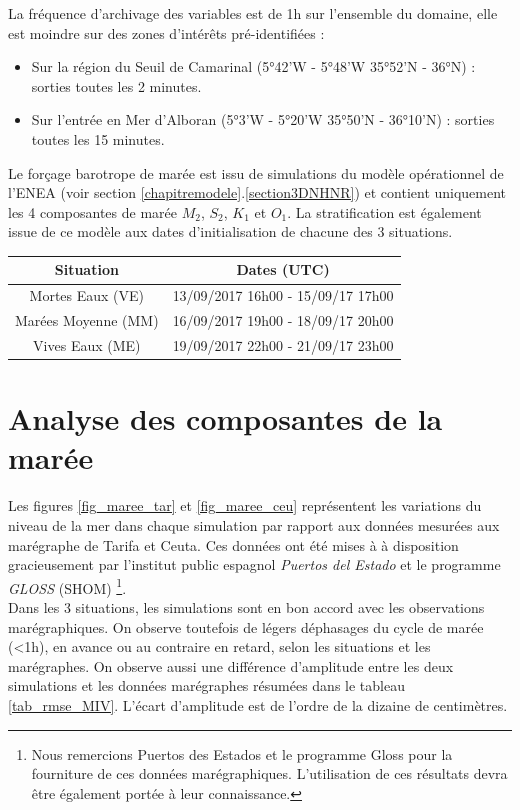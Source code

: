 \documentclass[a4paper,11pt]{report}
\begin{document}
\noindent La fréquence d'archivage des variables est de 1h sur l'ensemble du domaine, elle est moindre sur des zones d'intérêts pré-identifiées :
\begin{itemize}
\item Sur la région du Seuil de Camarinal (5°42'W - 5°48'W 35°52'N - 36°N) : sorties toutes les 2 minutes.
\item Sur l'entrée en Mer d'Alboran (5°3'W - 5°20'W 35°50'N - 36°10'N) : sorties toutes les 15 minutes.
\end{itemize}
Le forçage barotrope de marée est issu de simulations du modèle opérationnel de l'ENEA (voir section \ref{chapitremodele}.\ref{section3DNHNR}) et contient uniquement les 4 composantes de marée $M_2$, $S_2$, $K_1$ et $O_1$. 
La stratification est également issue de ce modèle aux dates d'initialisation de 
chacune des 3 situations.\\

\begin{table}[h]
        \centering
        \begin{tabular}{|c|c|}
                \hline
                Situation & Dates (UTC)\\
                \hline
                Mortes Eaux (VE) & 13/09/2017 16h00 - 15/09/17 17h00 \\
                Marées Moyenne (MM) & 16/09/2017 19h00 - 18/09/17 20h00  \\
                Vives Eaux (ME) & 19/09/2017 22h00 - 21/09/17 23h00  \\
                \hline
        \end{tabular}
        \label{tab_dates_MIV}
\end{table}

\section{Analyse des composantes de la marée}
\label{mareedelivrable}
Les figures \ref{fig_maree_tar} et \ref{fig_maree_ceu} représentent les variations du niveau de la mer dans chaque
simulation par rapport aux données mesurées aux marégraphe de Tarifa et Ceuta. Ces données ont été mises à à disposition
gracieusement par l'institut public espagnol \textit{Puertos del Estado} et le programme \textit{GLOSS} (SHOM) \footnote{Nous remercions Puertos des Estados et le programme Gloss pour la fourniture de ces données marégraphiques. L'utilisation de ces résultats devra être également portée à leur connaissance.}.\\
Dans les 3 situations, les simulations sont en bon accord avec les observations marégraphiques. On observe toutefois de légers déphasages du cycle de marée (<1h), en avance ou au contraire en retard, selon les situations et les marégraphes. On observe aussi une différence d'amplitude entre les deux simulations et les données marégraphes résumées dans le tableau \ref{tab_rmse_MIV}. L'écart d'amplitude est de l'ordre de la dizaine de centimètres.
\end{document}
